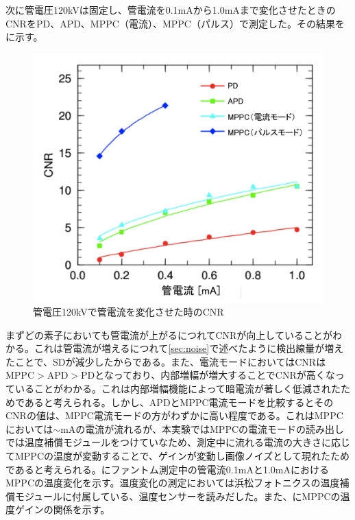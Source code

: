 次に管電圧120kVは固定し、管電流を0.1mAから1.0mAまで変化させたときのCNRをPD、APD、MPPC（電流）、MPPC（パルス）で測定した。その結果をに示す。



\begin{figure}[H]
 \begin{center}
 \includegraphics[bb=0.000000 0.000000 630.667865 539.955364,width=0.7\hsize]{image2/chapter5/cnr_current.png} 
 \end{center}
 \caption{管電圧120kVで管電流を変化させた時のCNR}
 \label{fig:cnr_current}
\end{figure}


まずどの素子においても管電流が上がるにつれてCNRが向上していることがわかる。これは管電流が増えるにつれて\ref{sec:noise}で述べたように検出線量が増えたことで、SDが減少したからである。また、電流モードにおいてはCNRはMPPC$>$APD$>$PDとなっており、内部増幅が増大することでCNRが高くなっていることがわかる。これは内部増幅機能によって暗電流が著しく低減されたためであると考えられる。しかし、APDとMPPC電流モードを比較するとそのCNRの値は、MPPC電流モードの方がわずかに高い程度である。これはMPPCにおいては$\sim$mAの電流が流れるが、本実験ではMPPCの電流モードの読み出しでは温度補償モジュールをつけていなため、測定中に流れる電流の大きさに応じてMPPCの温度が変動することで、ゲインが変動し画像ノイズとして現れたためであると考えられる。にファントム測定中の管電流0.1mAと1.0mAにおけるMPPCの温度変化を示す。温度変化の測定においては浜松フォトニクスの温度補償モジュールに付属している、温度センサーを読みだした。また、にMPPCの温度ゲインの関係を示す。



